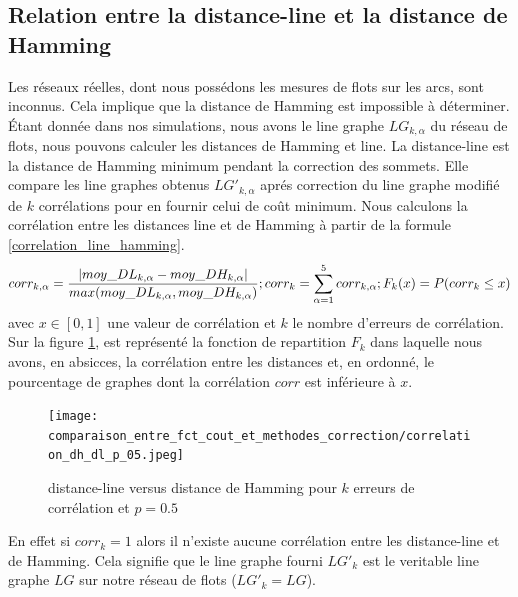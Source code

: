 \documentclass[onecolumn, 12pt]{book}
\begin{document}
\subsection{Relation entre la distance-line et la distance de Hamming}
Les r\'eseaux r\'eelles, dont nous poss\'edons les mesures de flots sur les arcs, sont inconnus.
Cela implique que la distance de Hamming est impossible \`a d\'eterminer.
\'Etant donn\'ee dans nos simulations, nous avons le line graphe $LG_{k,\alpha}$ du r\'eseau de flots, nous pouvons calculer les distances de Hamming et line.
La distance-line est la distance de Hamming minimum pendant la correction des sommets. 
Elle compare les line graphes obtenus $LG'_{k,\alpha}$ apr\'es correction du line graphe modifi\'e  de $k$ corr\'elations pour en fournir celui de co\^ut minimum.
\newline
Nous calculons la corr\'elation entre les distances line et de Hamming \`a partir de la formule \ref{correlation_line_hamming}.
\begin{equation}
	corr_{k,\alpha} =  \frac{ | moy\_DL_{k, \alpha} - moy\_DH_{k, \alpha} | }{ max(moy\_DL_{k, \alpha},  moy\_DH_{k, \alpha}) };
	\\
	corr_{k} = \sum_{\alpha = 1}^{5}corr_{k,\alpha} ;
	\\
	F_k (x) = P(corr_{k} \le x ) 
\end{equation}
avec $x \in [0,1]$ une valeur de corr\'elation et $k$ le nombre d'erreurs de corr\'elation. 
\newline
Sur la figure \ref{dh_vs_dl_p_05}, est repr\'esent\'e la fonction de repartition $F_k$ dans laquelle nous avons, en absicces, la corr\'elation entre les distances et, en ordonn\'e, le pourcentage de graphes dont la corr\'elation $corr$ est inf\'erieure \`a $x$.
\begin{centering} 
\begin{figure}[htb!] 
\texttt{[image: comparaison\_entre\_fct\_cout\_et\_methodes\_correction/correlation\_dh\_dl\_p\_05.jpeg]}
\caption{ distance-line versus distance de Hamming pour $k$ erreurs de corr\'elation et $p = 0.5$ }
\label{dh_vs_dl_p_05} 
\end{figure}
\end{centering} 
En effet si $corr_k = 1$ alors il n'existe aucune corr\'elation entre les distance-line et de Hamming. Cela signifie que le line graphe fourni $LG'_{k}$ est  le veritable line graphe $LG$ sur notre r\'eseau de flots ($LG'_{k} = LG$). 
\end{document}
